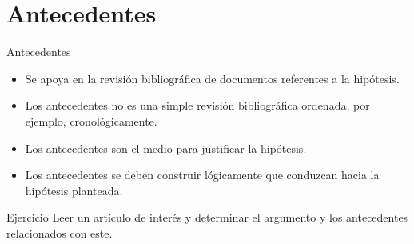 \documentclass[
10pt,
aspectratio=169,
]{beamer}
\begin{document}
\section{Antecedentes}
\begin{frame}{Antecedentes}

\begin{itemize}
\item Se apoya en la revisi\'on bibliogr\'afica de documentos referentes a la hip\'otesis. 
\item Los antecedentes no es una simple revisi\'on bibliogr\'afica ordenada, por ejemplo, cronol\'ogicamente.  
\item Los antecedentes son el medio para justificar la hip\'otesis. 
\item Los antecedentes se deben construir l\'ogicamente que conduzcan hacia la hip\'otesis planteada.
\end{itemize}
\end{frame}

\begin{frame}{Ejercicio}
Leer un art\'iculo de inter\'es y determinar el argumento y los antecedentes relacionados con este.
\end{frame}
\end{document}
